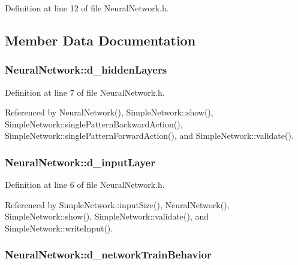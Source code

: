 Definition at line 12 of file NeuralNetwork.h.



\subsection{Member Data Documentation}
\hypertarget{class_neural_network_ae47be9819644d8ecf23328cf4e8f6dfb}{
\subsubsection[{d\_\-hiddenLayers}]{ {\bf NeuralNetwork::d\_\-hiddenLayers}}}
\label{class_neural_network_ae47be9819644d8ecf23328cf4e8f6dfb}


Definition at line 7 of file NeuralNetwork.h.



Referenced by NeuralNetwork(), SimpleNetwork::show(), SimpleNetwork::singlePatternBackwardAction(), SimpleNetwork::singlePatternForwardAction(), and SimpleNetwork::validate().

\hypertarget{class_neural_network_ada358911107a3a4cdccf0812d876393f}{
\subsubsection[{d\_\-inputLayer}]{ {\bf NeuralNetwork::d\_\-inputLayer}}}
\label{class_neural_network_ada358911107a3a4cdccf0812d876393f}


Definition at line 6 of file NeuralNetwork.h.



Referenced by SimpleNetwork::inputSize(), NeuralNetwork(), SimpleNetwork::show(), SimpleNetwork::validate(), and SimpleNetwork::writeInput().

\hypertarget{class_neural_network_aceb363923df9d29642b4e41e47e10267}{
\subsubsection[{d\_\-networkTrainBehavior}]{ {\bf NeuralNetwork::d\_\-networkTrainBehavior}}}
\label{class_neural_network_aceb363923df9d29642b4e41e47e10267}


